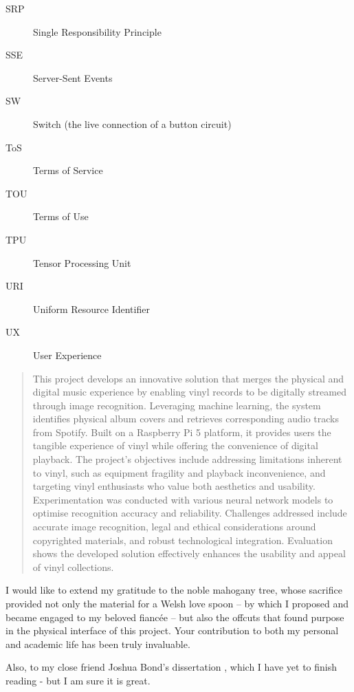 \begin{description}
        \item[SRP] Single Responsibility Principle
        \item[SSE] Server-Sent Events
        \item[SW] Switch (the live connection of a button circuit) 
        \item[ToS] Terms of Service
        \item[TOU] Terms of Use
        \item[TPU] Tensor Processing Unit 
        \item[URI] Uniform Resource Identifier
        \item[UX] User Experience
      \end{description}
    
    \begin{abstract} %
    
        This project develops an innovative solution that merges the physical and digital music experience by enabling vinyl records to be digitally streamed through image recognition. Leveraging machine learning, the system identifies physical album covers and retrieves corresponding audio tracks from Spotify. Built on a Raspberry Pi 5 platform, it provides users the tangible experience of vinyl while offering the convenience of digital playback. The project's objectives include addressing limitations inherent to vinyl, such as equipment fragility and playback inconvenience, and targeting vinyl enthusiasts who value both aesthetics and usability. Experimentation was conducted with various neural network models to optimise recognition accuracy and reliability. Challenges addressed include accurate image recognition, legal and ethical considerations around copyrighted materials, and robust technological integration. Evaluation shows the developed solution effectively enhances the usability and appeal of vinyl collections.
    
    \end{abstract}%
    \clearpage
    
    
    
    \uomdeclarations %
    
    
    
    \begin{uomacknowledgements}
    I would like to extend my gratitude to the noble mahogany tree, whose sacrifice provided not only the material for a Welsh love spoon -- by which I proposed and became engaged to my beloved fiancée -- but also the offcuts that found purpose in the physical interface of this project. Your contribution to both my personal and academic life has been truly invaluable.
    
    Also, to my close friend Joshua Bond’s dissertation \cite{jdbond}, which I have yet to finish reading - but I am sure it is great.
    \end{uomacknowledgements}
    
